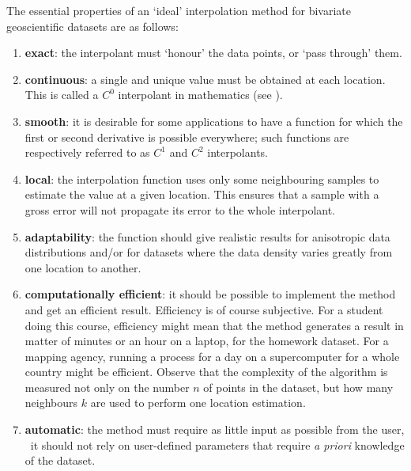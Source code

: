 The essential properties of an `ideal' interpolation method for bivariate geoscientific datasets are as follows:
\begin{enumerate}
  \item \textbf{exact}: the interpolant must `honour' the data points, or `pass through' them.
  \item \textbf{continuous}: a single and unique value must be obtained at each location. This is called a $C^0$ interpolant in mathematics (see ).
  \item \textbf{smooth}: it is desirable for some applications to have a function for which the first or second derivative is possible everywhere; such functions are respectively referred to as $C^1$ and $C^2$ interpolants.
  \item \textbf{local}: the interpolation function uses only some neighbouring samples to estimate the value at a given location. This ensures that a sample with a gross error will not propagate its error to the whole interpolant.
  \item \textbf{adaptability}: the function should give realistic results for anisotropic data distributions and/or for datasets where the data density varies greatly from one location to another.
  \item \textbf{computationally efficient}: it should be possible to implement the method and get an efficient result. Efficiency is of course subjective. For a student doing this course, efficiency might mean that the method generates a result in matter of minutes or an hour on a laptop, for the homework dataset. For a mapping agency, running a process for a day on a supercomputer for a whole country might be efficient. Observe that the complexity of the algorithm is measured not only on the number $n$ of points in the dataset, but how many neighbours $k$ are used to perform one location estimation.
  \item \textbf{automatic}: the method must require as little input as possible from the user, \ie\ it should not rely on user-defined parameters that require \emph{a priori} knowledge of the dataset.
\end{enumerate}
